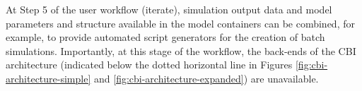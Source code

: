 \documentclass{article}
\begin{document}
At Step 5 of the user workflow (iterate), simulation output data and model parameters and structure available in the model containers can be combined, for example, to provide automated script generators for the creation of batch simulations. Importantly, at this stage of the workflow, the back-ends of the CBI architecture (indicated below the dotted horizontal line in Figures \ref{fig:cbi-architecture-simple} and \ref{fig:cbi-architecture-expanded}) are unavailable. 






\end{document}

